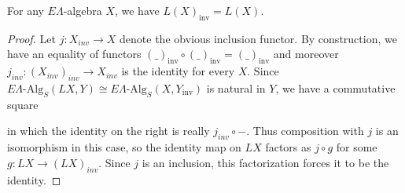 \documentclass{amsbook} %
\newenvironment{eq*}{\begin{equation*}}{\end{equation*}}
\numberwithin{section}{chapter}
\begin{document}
\begin{prop} \label{linveql} For any $E\Lambda$-algebra $X$, we have $L(X)_{\mathrm{inv}} = L(X)$.
\end{prop}
\begin{proof}
Let $j: X_{inv} \to X$ denote the obvious inclusion functor. By construction, we have an equality of functors $(\_)_{\mathrm{inv}} \circ (\_)_{\mathrm{inv}} = (\_)_{\mathrm{inv}}$ and moreover $j_{inv}: (X_{inv})_{inv} \to X_{inv}$ is the identity for every $X$. Since $E\Lambda\mbox{-}\mathrm{Alg}_S(LX , Y)\cong E\Lambda\mbox{-}\mathrm{Alg}_S(X, Y_{\mathrm{inv}})$ is natural in $Y$, we have a commutative square
\begin{center}
    \end{center}
in which the identity on the right is really $j_{inv} \circ -$. Thus composition with $j$ is an isomorphism in this case, so the identity map on $LX$ factors as $j \circ g$ for some $g: LX \to (LX)_{inv}$. Since $j$ is an inclusion, this factorization forces it to be the identity.



\end{proof}
\end{document}
